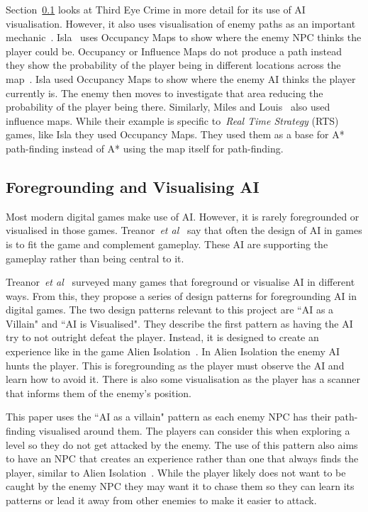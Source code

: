 \documentclass[journal]{IEEEtran}
\begin{document}
	Section~\ref{VisualisingAI} looks at Third Eye Crime in more detail for its use of AI visualisation. However, it also uses visualisation of enemy paths as an important mechanic~\cite{Isla2014, game:ThirdEyeCrime}.  Isla~\cite{Isla2014} uses Occupancy Maps to show where the enemy NPC thinks the player could be. Occupancy or Influence Maps do not produce a path instead they show the probability of the player being in different locations across the map~\cite{Isla2014, Miles2006}. Isla used Occupancy Maps to show where the enemy AI thinks the player currently is. The enemy then moves to investigate that area reducing the probability of the player being there.  Similarly, Miles and Louis~\cite{Miles2006} also used influence maps. While their example is specific to~\textit{Real Time Strategy} (RTS) games, like Isla they used Occupancy Maps.  They used them as a base for A* path-finding instead of A* using the map itself for path-finding.
	
	
	\subsection{Foregrounding and Visualising AI} \label{VisualisingAI}
	Most modern digital games make use of AI.  However, it is rarely foregrounded or visualised in those games. Treanor~\textit{et al}~\cite{treanor2015} say that often the design of AI in games is to fit the game and complement gameplay. These AI are supporting the gameplay rather than being central to it.
	
	Treanor~\textit{et al}~\cite{treanor2015} surveyed many games that foreground or visualise AI in different ways.   From this, they propose a series of design patterns for foregrounding AI in digital games. 
	The two design patterns relevant to this project are ``AI as a Villain" and ``AI is Visualised".  They describe the first pattern as having the AI try to not outright defeat the player. Instead, it is designed to create an experience like in the game Alien Isolation~\cite{treanor2015, game:AlienIsolation}.  In Alien Isolation the enemy AI hunts the player. This is foregrounding as the player must observe the AI and learn how to avoid it. There is also some visualisation as the player has a scanner that informs them of the enemy's position. 
	
	This paper uses the ``AI as a villain" pattern as each enemy NPC has their path-finding visualised around them. The players can consider this when exploring a level so they do not get attacked by the enemy. The use of this pattern also aims to have an NPC that creates an experience rather than one that always finds the player, similar to Alien Isolation~\cite{game:AlienIsolation,treanor2015}. While the player likely does not want to be caught by the enemy NPC they may want it to chase them so they can learn its patterns or lead it away from other enemies to make it easier to attack. 
	
\end{document}
